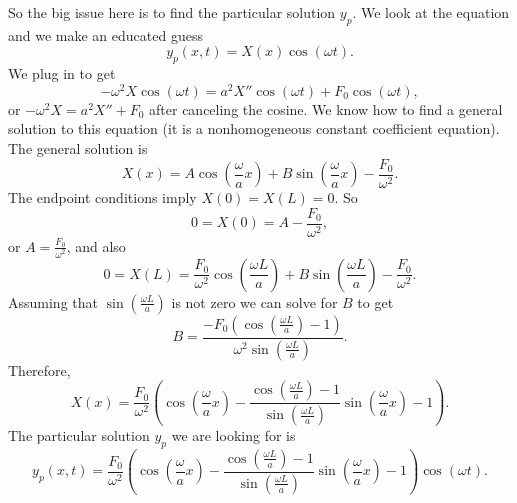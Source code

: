 \documentclass{ximera}
\begin{document}
So the big issue here is to find the particular solution $y_p$. We look at the equation and we make an educated guess
\begin{equation*}
    y_p(x,t) = X(x) \cos (\omega t) .
\end{equation*}
We plug in to get
\begin{equation*}
    -\omega^2 X \cos ( \omega t) = a^2 X'' \cos ( \omega t) + F_0 \cos ( \omega t ) ,
\end{equation*}
or $-\omega^2 X = a^2 X'' + F_0$ after canceling the cosine. We know how to find a general solution to this equation (it is a nonhomogeneous constant coefficient equation). The general solution is
\begin{equation*}
    X(x) = A \cos \left( \frac{\omega}{a} x \right) + B \sin \left( \frac{\omega}{a} x \right) - \frac{F_0}{\omega^2} .
\end{equation*}
The endpoint conditions imply $X(0) = X(L) = 0$.  So
\begin{equation*}
    0 = X(0) = A - \frac{F_0}{\omega^2} ,
\end{equation*}
or $A = \frac{F_0}{\omega^2}$, and also
\begin{equation*}
    0 = X(L) = \frac{F_0}{\omega^2} \cos \left( \frac{\omega L}{a} \right) + B \sin \left( \frac{\omega L}{a} \right) - \frac{F_0}{\omega^2} .
\end{equation*}
Assuming that $\sin ( \frac{\omega L}{a} )$ is not zero we can solve for $B$ to get
\begin{equation} \label{natfreq:Beq}
    B = \frac{-F_0 \left( \cos \left( \frac{\omega L}{a} \right) - 1 \right)}%
    {\omega^2 \sin \left( \frac{\omega L}{a} \right)}.
\end{equation}
Therefore,
\begin{equation*}
    X(x) = \frac{F_0}{\omega^2} \left(\cos \left(  \frac{\omega}{a} x \right) -\frac{\cos \left( \frac{\omega L}{a} \right) - 1}%
    {\sin \left( \frac{\omega L}{a} \right)} \sin \left( \frac{\omega}{a} x \right)- 1\right) .
\end{equation*}
The particular solution $y_p$ we are looking for is
\begin{equation*}
    y_p(x,t) =\frac{F_0}{\omega^2} \left(\cos \left( \frac{\omega}{a} x \right) - \frac{\cos \left( \frac{\omega L}{a} \right) - 1}%
    {\sin \left( \frac{\omega L}{a}\right)} \sin \left( \frac{\omega}{a} x \right) -1 \right) \cos ( \omega t) .
\end{equation*}
\end{document}
